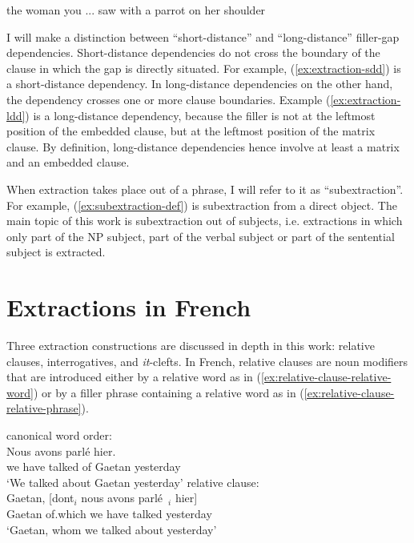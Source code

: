 \ea the woman you ... saw with a parrot on her shoulder \label{ex:filler-gap-dependency}
\z  

I will make a distinction between ``short-distance'' and ``long-distance'' filler-gap dependencies. Short-distance dependencies do not cross the boundary of the clause in which the gap is directly situated. For example, (\ref{ex:extraction-sdd}) is a short-distance dependency. In long-distance dependencies on the other hand, the dependency crosses one or more clause boundaries. Example (\ref{ex:extraction-ldd}) is a long-distance dependency, because the filler is not at the leftmost position of the embedded clause, but at the leftmost position of the matrix clause. By definition, long-distance dependencies hence involve at least a matrix and an embedded clause. 

\eal 
{}
\zl 

When extraction takes place out of a phrase, I will refer to it as ``subextraction''. For example, (\ref{ex:subextraction-def}) is subextraction from a direct object. The main topic of this work is subextraction out of subjects, i.e. extractions in which only part of the NP subject, part of the verbal subject or part of the sentential subject is extracted.

\label{ex:subextraction-def}
\z 

\section{Extractions in French}
\begin{sloppypar}
Three extraction constructions are discussed in depth in this work: relative clauses, interrogatives, and \emph{it}-clefts. In French, relative clauses are noun modifiers that are introduced either by a relative word as in (\ref{ex:relative-clause-relative-word}) or by a filler phrase containing a relative word as in (\ref{ex:relative-clause-relative-phrase}). 
\end{sloppypar}

\eal 
\ex canonical word order: \\ 
\gll Nous avons parlé   hier.\\
we have talked of Gaetan yesterday\\
\glt `We talked about Gaetan yesterday'
\ex relative clause: \\
\gll Gaetan, [dont$_i$ nous avons parlé~\trace{}$_i$ hier]\\
Gaetan of.which we have talked yesterday\\
\glt `Gaetan, whom we talked about yesterday'
\label{ex:relative-clause-relative-word}
\zl 

